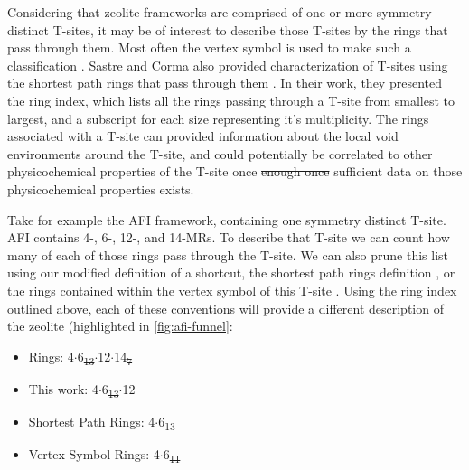 \documentclass[preprint,numrefs,noinfo,sort&compress]{elsarticle}
\providecommand{\DIFadd}[1]{{\protect\color{blue}\uwave{#1}}} %
\providecommand{\DIFdel}[1]{{\protect\color{red}\sout{#1}}}                      %
\providecommand{\DIFaddbegin}{} %
\providecommand{\DIFaddend}{} %
\providecommand{\DIFdelbegin}{} %
\providecommand{\DIFdelend}{} %
\newcommand{\DIFscaledelfig}{0.5}
\newlength{\DIFdelgraphicswidth} %
\newlength{\DIFdelgraphicsheight} %
\newcommand{\DIFaddincludegraphics}[2][]{{\color{blue}\fbox{\DIFOincludegraphics[#1]{#2}}}} %
\newcommand{\DIFdelincludegraphics}[2][]{%
\sbox{\DIFdelgraphicsbox}{\DIFOincludegraphics[#1]{#2}}%
\settoboxwidth{\DIFdelgraphicswidth}{\DIFdelgraphicsbox} %
\settoboxtotalheight{\DIFdelgraphicsheight}{\DIFdelgraphicsbox} %
\scalebox{\DIFscaledelfig}{%
\parbox[b]{\DIFdelgraphicswidth}{\usebox{\DIFdelgraphicsbox}\\[-\baselineskip] \rule{\DIFdelgraphicswidth}{0em}}\llap{\resizebox{\DIFdelgraphicswidth}{\DIFdelgraphicsheight}{%
\setlength{\unitlength}{\DIFdelgraphicswidth}%
\begin{picture}(1,1)%
\thicklines\linethickness{2pt} %
{\color[rgb]{1,0,0}\put(0,0){\framebox(1,1){}}}%
{\color[rgb]{1,0,0}\put(0,0){\line( 1,1){1}}}%
{\color[rgb]{1,0,0}\put(0,1){\line(1,-1){1}}}%
\end{picture}%
}\hspace*{3pt}}} %
} %
\DeclareRobustCommand{\DIFaddbegin}{\DIFOaddbegin \let\includegraphics\DIFaddincludegraphics} %
\DeclareRobustCommand{\DIFaddend}{\DIFOaddend \let\includegraphics\DIFOincludegraphics} %
\DeclareRobustCommand{\DIFdelbegin}{\DIFOdelbegin \let\includegraphics\DIFdelincludegraphics} %
\DeclareRobustCommand{\DIFdelend}{\DIFOaddend \let\includegraphics\DIFOincludegraphics} %
\begin{document}
Considering that zeolite frameworks are comprised of one or more symmetry distinct T-sites, it may be of interest to describe those T-sites by the rings that pass through them. Most often the vertex symbol is used to make such a classification \cite{okeeffe-vertex-1997}. Sastre and Corma also provided characterization of T-sites using the shortest path rings that pass through them \cite{sastre-topological-2009}. In their work, they presented the ring index, which lists all the rings passing through a T-site from smallest to largest, and a subscript for each size representing it's multiplicity.  The rings associated with a T-site can \DIFdelbegin \DIFdel{provided }\DIFdelend \DIFaddbegin \DIFadd{provide }\DIFaddend information about the local void environments around the T-site, and could potentially be correlated to other physicochemical properties of the T-site once \DIFdelbegin \DIFdel{enough once }\DIFdelend sufficient data on those physicochemical properties exists. 

Take for example the AFI framework, containing one symmetry distinct T-site. AFI contains 4-, 6-, 12-, and 14-MRs. To describe that T-site we can count how many of each of those rings pass through the T-site. We can also prune this list using our modified definition of a shortcut, the shortest path rings definition \cite{sastre-topological-2009}, or the rings contained within the vertex symbol of this T-site \cite{okeeffe-vertex-1997}. Using the ring index outlined above, each of these conventions will provide a different description of the zeolite (highlighted in \cref{fig:afi-funnel}\DIFaddbegin \DIFadd{)}\DIFaddend :
\begin{itemize}
\item Rings: 4\(\cdot\)6\DIFdelbegin \DIFdel{\textsubscript{13}\(\cdot\)}\DIFdelend \DIFaddbegin \DIFadd{\(_{\text{13}} \cdot\)}\DIFaddend 12\(\cdot\)14\DIFdelbegin \DIFdel{\textsubscript{7}
}\DIFdelend \DIFaddbegin \DIFadd{\(_{\text{7}}\)
}\DIFaddend \item This work: 4\(\cdot\)6\DIFdelbegin \DIFdel{\textsubscript{13}\(\cdot\)}\DIFdelend \DIFaddbegin \DIFadd{\(_{\text{13}} \cdot\)}\DIFaddend 12
\item Shortest Path Rings: 4\(\cdot\)6\DIFdelbegin \DIFdel{\textsubscript{13}
}\DIFdelend \DIFaddbegin \DIFadd{\(_{\text{13}}\)
}\DIFaddend \item Vertex Symbol Rings: 4\(\cdot\)6\DIFdelbegin \DIFdel{\textsubscript{11}
}\DIFdelend \DIFaddbegin \DIFadd{\(_{\text{11}}\)
}\DIFaddend \end{itemize}
\end{document}
